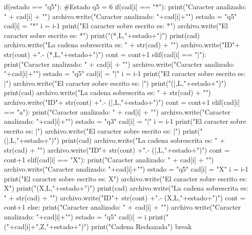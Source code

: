 \documentclass{article}
\begin{document}
\begin{python}
					if(estado == "q5"): #Estado q5 = 6
						if(cad[i] == "*"):
							print("Caracter analizado: " + cad[i] + "\n")
							archivo.write("Caracter analizado: "+cad[i]+"\n")
							estado = "q5"
							cad[i] = "*"
							i = i-1
							print("El caracter sobre escrito es: *\n")
							archivo.write("El caracter sobre escrito es: *\n")
							print("(*,L,"+estado+")\n")
							print(cad)
							archivo.write("La cadena sobrescrita es: " + str(cad) + "\n")
							archivo.write("ID"+ str(cont) +".- (*,L,"+estado+")\n\n")
							cont = cont+1
						elif(cad[i] == "|"):
							print("Caracter analizado: " + cad[i] + "\n")
							archivo.write("Caracter analizado: "+cad[i]+"\n")
							estado = "q5"
							cad[i] = "|"
							i = i-1
							print("El caracter sobre escrito es: |\n")
							archivo.write("El caracter sobre escrito es: |\n")
							print("(|,L,"+estado+")\n")
							print(cad)
							archivo.write("La cadena sobrescrita es: " + str(cad) + "\n")
							archivo.write("ID"+ str(cont) +".- (|,L,"+estado+")\n\n")
							cont = cont+1
						elif(cad[i] == "a"):
							print("Caracter analizado: " + cad[i] + "\n")
							archivo.write("Caracter analizado: "+cad[i]+"\n")
							estado = "q3"
							cad[i] = "|"
							i = i-1
							print("El caracter sobre escrito es: |\n")
							archivo.write("El caracter sobre escrito es: |\n")
							print("(|,L,"+estado+")\n")
							print(cad)
							archivo.write("La cadena sobrescrita es: " + str(cad) + "\n")
							archivo.write("ID"+ str(cont) +".- (|,L,"+estado+")\n\n")
							cont = cont+1
						elif(cad[i] == "X"):
							print("Caracter analizado: " + cad[i] + "\n")
							archivo.write("Caracter analizado: "+cad[i]+"\n")
							estado = "q5"
							cad[i] = "X"
							i = i-1
							print("El caracter sobre escrito es: X\n")
							archivo.write("El caracter sobre escrito es: X\n")
							print("(X,L,"+estado+")\n")
							print(cad)
							archivo.write("La cadena sobrescrita es: " + str(cad) + "\n")
							archivo.write("ID"+ str(cont) +".- (X,L,"+estado+")\n\n")
							cont = cont+1
						else:
							print("Caracter analizado: " + cad[i] + "\n")
							archivo.write("Caracter analizado: "+cad[i]+"\n")
							estado = "q5"
							cad[i] = i
							print("("+cad[i]+",Z,"+estado+")\n")
							print("Cadena Rechazada")
							break 
				

\end{python}
\end{document}
